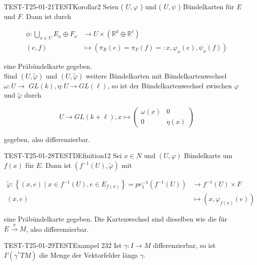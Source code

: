 \begin{PROP}{TEST-T25-01-21}{TESTKorollar2}
Seien ( $U, \varphi$ ) und ( $U, \psi$ ) Bündelkarten für $E$ und $F$. Dann ist durch

$$
\begin{aligned}
\phi: \bigcup_{x \in U} E_{x} \oplus F_{x} & \rightarrow U \times\left(\mathbb{R}^{k} \oplus \mathbb{R}^{\ell}\right) \\
(e, f) & \mapsto\left(\pi_{E}(e)=\pi_{F}(f)=: x, \varphi_{x}(e), \psi_{x}(f)\right)
\end{aligned}
$$

eine Präbündelkarte gegeben.\\
Sind $(U, \tilde{\varphi})$ und $(U, \tilde{\varphi})$ weitere Bündelkarten mit Bündelkartenwechsel $\omega: U \rightarrow$ $G L(k), \eta: U \rightarrow G L(\ell)$, so ist der Bündelkartenwechsel zwischen $\varphi$ und $\tilde{\varphi}$ durch

$$
U \rightarrow G L(k+\ell), x \mapsto\left(\begin{array}{cc}
\omega(x) & 0 \\
0 & \eta(x)
\end{array}\right)
$$

gegeben, also differenzierbar.
\end{PROP}\begin{DEF}{TEST-T25-01-28}{TESTDEfinition12}
Sei $x \in N$ und $(U, \varphi)$ Bündelkarte um $f(x)$ für $E$. Dann ist $\left(f^{-1}(U), \tilde{\varphi}\right)$ mit

$$
\begin{aligned}
\tilde{\varphi}:\left\{(x, e) \mid x \in f^{-1}(U), e \in E_{f(x)}\right\}=p r_{1}^{-1}\left(f^{-1}(U)\right) & \longrightarrow f^{-1}(U) \times F \\
(x, e) & \mapsto\left(x, \varphi_{f(x)}(e)\right)
\end{aligned}
$$

eine Präbündelkarte gegeben. Die Kartenwechsel sind dieselben wie die für $E \xrightarrow{\pi} M$, also differenzierbar.
\end{DEF}\begin{EXA}{TEST-T25-01-29}{TESTExampel 232}
Ist $\gamma: I \rightarrow M$ differenzierbar, so ist $\Gamma\left(\gamma^{*} T M\right)$ die Menge der Vektorfelder längs $\gamma$.
\end{EXA}\documentclass[10pt, letterpaper]{article}


